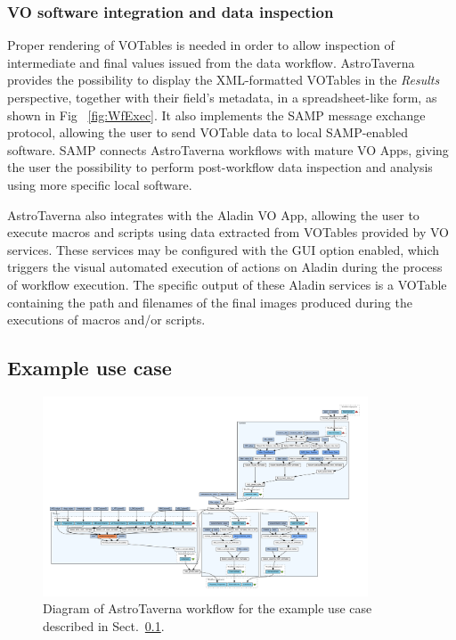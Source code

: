 \documentclass{aa}
\begin{document}
\subsubsection{VO software integration and data inspection}
\label{VOApps}

Proper rendering of VOTables is needed in order to allow inspection of intermediate and final values issued from the data workflow. AstroTaverna provides the possibility to display the XML-formatted VOTables in the \emph{Results} perspective, together with their field’s metadata, in a spreadsheet-like form, as shown in Fig ~\ref{fig:WfExec}. It also implements the SAMP message exchange protocol, allowing the user to send VOTable data to local SAMP-enabled software. SAMP connects AstroTaverna workflows with mature VO Apps, giving the user the possibility to perform post-workflow data inspection and analysis using more specific local software.

AstroTaverna also integrates with the Aladin VO App, allowing the user to execute macros and scripts using data extracted from VOTables provided by VO services. These services may be configured with the GUI option enabled, which triggers the visual automated execution of actions on Aladin during the process of workflow execution. The specific output of these Aladin services is a VOTable containing the path and filenames of the final images produced during the executions of macros and/or scripts.  

\subsection{Example use case}
\label{Usecase}

\begin{figure}[tb]
\centering 
\includegraphics[width=0.86\textwidth]{WfDiagram}
\caption{Diagram of AstroTaverna workflow for the example use case described in Sect.~\ref{Usecase}.}
\label{fig:WfDiagram}
\end{figure}
\end{document}
